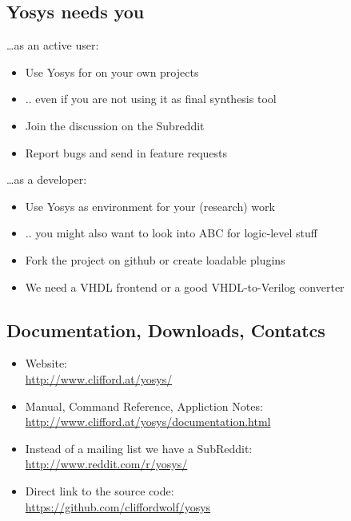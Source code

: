 
\subsection{Yosys needs you}

\begin{frame}{\subsecname}
\dots as an active user:
\begin{itemize}
\item Use Yosys for on your own projects
\item .. even if you are not using it as final synthesis tool
\item Join the discussion on the Subreddit
\item Report bugs and send in feature requests
\end{itemize}

\bigskip
\dots as a developer:
\begin{itemize}
\item Use Yosys as environment for your (research) work
\item .. you might also want to look into ABC for logic-level stuff
\item Fork the project on github or create loadable plugins
\item We need a VHDL frontend or a good VHDL-to-Verilog converter
\end{itemize}
\end{frame}


\subsection{Documentation, Downloads, Contatcs}

\begin{frame}{\subsecname}
\begin{itemize}
\item Website: \\
\smallskip\hskip1cm\url{http://www.clifford.at/yosys/}

\bigskip
\item Manual, Command Reference, Appliction Notes: \\
\smallskip\hskip1cm\url{http://www.clifford.at/yosys/documentation.html}

\bigskip
\item Instead of a mailing list we have a SubReddit: \\
\smallskip\hskip1cm\url{http://www.reddit.com/r/yosys/}

\bigskip
\item Direct link to the source code: \\
\smallskip\hskip1cm\url{https://github.com/cliffordwolf/yosys}
\end{itemize}
\end{frame}

